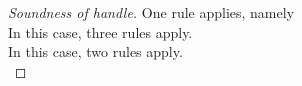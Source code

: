 \begin{proof}[Soundness of handle]
{One rule applies, namely \\
%
%
%
}
%
 {
In this case, three rules apply.\\
   {
   }
%
  {
%
%
%
}
  {
%
%
  }
 }
%
{
In this case, two rules apply.\\
}
\end{proof}
